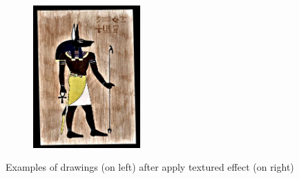 \begin{figure}
\begin{subfigure}[b]{0.5\textwidth}
         \includegraphics[width=0.45\textwidth]{images/style_augments/2019_14-17_0188_RUS_R_C_texture.jpg}
         \caption{}
     \end{subfigure}
     \caption{Examples of drawings (on left) after apply textured effect (on right)}
     \label{fig:texture-style-effects}
\end{figure}

